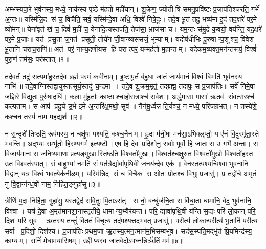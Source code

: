 \closesection
\clearpage

\setcounter{anuvakam}{0}


अम्भ॑स्यपा॒रे भुव॑नस्य॒ मध्ये॒ नाक॑स्य पृ॒ष्ठे म॑ह॒तो मही॑यान्। शु॒क्रेण॒ ज्योतीषि समनु॒प्रवि॑ष्टः प्र॒जाप॑तिश्चरति॒ गर्भे॑ अ॒न्तः॥ यस्मि॑न्नि॒द सं च॒ विचैति॒ सर्वं॒ यस्मि॑न्दे॒वा अधि॒ विश्वे॑ निषे॒दुः। तदे॒व भू॒तं तदु॒ भव्य॑मा इ॒दं तद॒क्षरे॑ पर॒मे व्यो॑मन्॥ येना॑वृ॒तं खं च॒ दिवं॑ म॒हीं च॒ येना॑दि॒त्यस्तप॑ति॒ तेज॑सा॒ भ्राज॑सा च। यम॒न्तः स॑मु॒द्रे क॒वयो॒ वय॑न्ति॒ यद॒क्षरे॑ पर॒मे प्र॒जाः॥ यत॑ प्रसू॒ता ज॒गत॑ प्रसूती॒ तोये॑न जी॒वान्व्यस॑सर्ज॒ भूम्याम्। यदोष॑धीभिः पु॒रुषान्प॒शूश्च॒ विवे॑श भू॒तानि॑ चराच॒राणि॑॥ अत॑ परं॒ नान्य॒दणी॑यस हि॒ परात्परं॒ यन्मह॑तो म॒हान्तम्। यदे॑कम॒व्यक्त॒मन॑न्तरूपं॒  विश्वं॑ पुरा॒णं तम॑सः॒ पर॑स्तात्॥१॥

तदे॒वर्तं तदु॑ स॒त्यमा॑हु॒स्तदे॒व ब्रह्म॑ पर॒मं क॑वी॒नाम्। इ॒ष्टा॒पू॒र्तं ब॑हु॒धा जा॒तं जाय॑मानं  वि॒श्वं बि॑भर्ति॒ भुव॑नस्य॒ नाभि॑॥ तदे॒वाग्निस्तद्वा॒युस्तत्सूर्य॒स्तदु॑ च॒न्द्रमा। तदे॒व शु॒क्रम॒मृतं॒ तद्ब्रह्म॒ तदापः॒ स प्र॒जाप॑तिः॥ सर्वे॑ निमे॒षा ज॒ज्ञिरे॑ वि॒द्युतः॒ पुरु॑षा॒दधि॑। क॒ला मु॑हू॒र्ताः काष्ठाश्चाहोरा॒त्राश्च॑ सर्व॒शः॥ अ॒र्द्ध॒मा॒सा मासा॑ ऋ॒तव॑ संवत्स॒रश्च॑ कल्पताम्। स आप॑ प्रदु॒घे उ॒भे इ॒मे अ॒न्तरि॑क्ष॒मथो॒ सुव॑॥ नैन॑मू॒र्ध्वन्न ति॒र्यञ्चं॒ न मध्ये॒ परि॑जग्रभत्। न तस्ये॑शे॒ कश्च॒न तस्य॑ नाम म॒हद्यश॑॥२॥

न स॒न्दृशे॑ तिष्ठति॒ रूप॑मस्य॒ न चक्षु॑षा पश्यति॒ कश्च॒नैनम्। हृ॒दा म॑नी॒षा मन॑सा॒ऽभिक्लृ॑प्तो॒ य ए॑नं  वि॒दुरमृ॑ता॒स्ते भ॑वन्ति॥ अ॒द्भ्यः सम्भू॑तो हिरण्यग॒र्भ इत्य॒ष्टौ॥ ए॒ष हि दे॒वः प्र॒दिशोनु॒ सर्वाः॒ पूर्वो॑ हि जा॒तः स उ॒ गर्भे॑ अ॒न्तः। स वि॒जाय॑मानः स जनि॒ष्यमा॑णः प्र॒त्यङ्मुखास्तिष्ठति वि॒श्वतो॑मुखः॥ वि॒श्वत॑श्चक्षुरु॒त वि॒श्वतो॑मुखो वि॒श्वतो॑हस्त उ॒त वि॒श्वत॑स्पात्। सं बा॒हुभ्यां॒ नम॑ति॒ सं पत॑त्रै॒र्द्यावा॑पृथि॒वी ज॒नय॑न्दे॒व एक॑॥ वे॒नस्तत्पश्य॒न्विश्वा॒ भुव॑नानि वि॒द्वान् यत्र॒ विश्वं॒ भव॒त्येक॑नीळम्। यस्मि॑न्नि॒द सं च॒ विचैक॒ स ओतः॒ प्रोत॑श्च वि॒भुः प्र॒जासु॑। प्र तद्वो॑चे अ॒मृतं॒ नु वि॒द्वान्ग॑न्ध॒र्वो नाम॒ निहि॑त॒ङ्गुहा॑सु॥३॥

त्रीणि॑ प॒दा निहि॑ता॒ गुहा॑सु॒ यस्तद्वेद॑ सवि॒तुः पि॒ताऽस॑त्। स नो॒ बन्धु॑र्जनि॒ता स वि॑धा॒ता धामा॑नि॒ वेद॒ भुव॑नानि॒ विश्वा। यत्र॑ दे॒वा अ॒मृत॑मानशा॒नास्तृ॒तीये॒ धामान्य॒भ्यैर॑यन्त। परि॒ द्यावा॑पृथि॒वी य॑न्ति स॒द्यः परि॑ लो॒कान् परि॒ दिशः॒ परि॒ सुव॑। ऋ॒तस्य॒ तन्तुं॑  विततं  वि॒चृत्य॒ तद॑पश्य॒त्तद॑भवत् प्र॒जासु॑। प॒रीत्य॑ लो॒कान्प॒रीत्य॑ भू॒तानि॑ प॒रीत्य॒ सर्वा प्र॒दिशो॒ दिश॑श्च। प्र॒जाप॑तिः प्रथम॒जा ऋ॒तस्य॒\aav{}\aav{}त्मन॒\aav{}\aav{}त्मान॑म॒भिसम्ब॑भूव। सद॑स॒स्पति॒मद्भु॑तं प्रि॒यमिन्द्र॑स्य॒ काम्यम्। सनिं॑ मे॒धाम॑यासिषम्। उद्दीप्यस्व जातवेदोऽप॒घ्नन्निर्\mbox{}ऋ॑तिं॒ मम॑॥४॥

